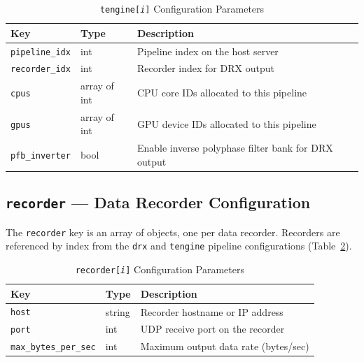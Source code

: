 \begin{table}[htbp]
    \centering
    \caption{\texttt{tengine[\textit{i}]} Configuration Parameters}
    \label{tab:config-tengine}
    \begin{tabular}{llp{7cm}}
        \toprule
        \textbf{Key} & \textbf{Type} & \textbf{Description} \\
        \midrule
        \texttt{pipeline\_idx}  & int          & Pipeline index on the host server \\
        \texttt{recorder\_idx}  & int          & Recorder index for DRX output \\
        \texttt{cpus}           & array of int & CPU core IDs allocated to this pipeline \\
        \texttt{gpus}           & array of int & GPU device IDs allocated to this pipeline \\
        \texttt{pfb\_inverter}  & bool         & Enable inverse polyphase filter bank for DRX output \\
        \bottomrule
    \end{tabular}
\end{table}

\subsection{\texttt{recorder} --- Data Recorder Configuration}

The \texttt{recorder} key is an array of objects, one per data recorder.
Recorders are referenced by index from the \texttt{drx} and \texttt{tengine}
pipeline configurations (Table~\ref{tab:config-recorder}).

\begin{table}[htbp]
    \centering
    \caption{\texttt{recorder[\textit{i}]} Configuration Parameters}
    \label{tab:config-recorder}
    \begin{tabular}{llp{7cm}}
        \toprule
        \textbf{Key} & \textbf{Type} & \textbf{Description} \\
        \midrule
        \texttt{host}              & string & Recorder hostname or IP address \\
        \texttt{port}              & int    & UDP receive port on the recorder \\
        \texttt{max\_bytes\_per\_sec} & int & Maximum output data rate (bytes/sec) \\
        \bottomrule
    \end{tabular}
\end{table}

